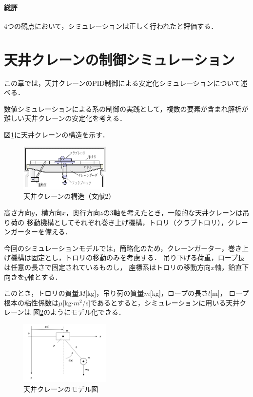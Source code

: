 \documentclass[dvipdfmx,titlepage,a4j]{jsarticle}  %
\begin{document}
\paragraph{総評\\}
4つの観点において，シミュレーションは正しく行われたと評価する．

\section{天井クレーンの制御シミュレーション}
この章では，天井クレーンのPID制御による安定化シミュレーションについて述べる．

数値シミュレーションによる系の制御の実践として，複数の要素が含まれ解析が難しい天井クレーンの安定化を考える．

図\ref{fig:crane}に天井クレーンの構造を示す．

\begin{figure}[htbp]
  \centering
  \includegraphics[width=0.4\textwidth]{../graph/crane.png}
  \caption{天井クレーンの構造（文献2）}
  \label{fig:crane}
\end{figure}


高さ方向$y$，横方向$x$，奥行方向$z$の3軸を考えたとき，一般的な天井クレーンは吊り荷の
移動機構としてそれぞれ巻き上げ機構，トロリ（クラブトロリ），クレーンガーターを備える．

今回のシミュレーションモデルでは，簡略化のため，クレーンガーター，巻き上げ機構は固定とし，トロリの移動のみを考慮する．
吊り下げる荷重，ロープ長は任意の長さで固定されているものし，
座標系はトロリの移動方向$x$軸，鉛直下向きを$y$軸とする．

このとき，トロリの質量$M$[kg]，吊り荷の質量$m$[kg]，ロープの長さ$l$[m]，
ロープ根本の粘性係数は$\mu$[kg$\cdot m^2$/s]であるとすると，シミュレーションに用いる天井クレーンは
図\ref{fig:crane-po}のようにモデル化できる．

\begin{figure}[htbp]
  \centering
  \includegraphics[width=0.4\textwidth]{../graph/ex-po.png}
  \caption{天井クレーンのモデル図}
  \label{fig:crane-po}
\end{figure}
\end{document}
